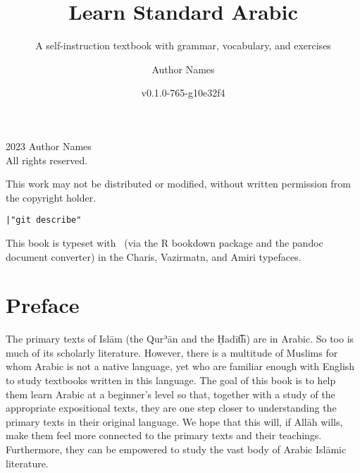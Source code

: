 \documentclass[
  10pt,
]{book}
\title{Learn Standard Arabic}
\subtitle{A self-instruction textbook with grammar, vocabulary, and exercises}
\author{Author Names}
\date{v0.1.0-765-g10e32f4}
\newcommand{\gitTag}{|"git describe"}
\begin{document}
\maketitle

\thispagestyle{empty}
\begingroup
\footnotesize
\parindent 0pt
\parskip \baselineskip
\textcopyright{} 2023 Author Names \\
All rights reserved.

    This work may not be distributed or modified, without written permission from the copyright holder.

\texttt{\gitTag}

This book is typeset with \XeLaTeX\ (via the R bookdown package and the pandoc document converter)
in the Charis, Vazirmatn, and Amiri typefaces.


\vfill




\endgroup
\clearpage

\newpage
\pagestyle{mymainstyle}
\begingroup
\setlength{\cftbeforechapskip}{-3pt}
\endgroup


{
\setcounter{tocdepth}{1}
\tableofcontents
}
\chapter*{Preface}\label{preface}


\begin{center}
\end{center}

The primary texts of Islām (the Qurʾān and the Ḥadīt͡h) are in Arabic. So too is much of its scholarly literature. However, there is a multitude of Muslims for whom Arabic is not a native language, yet who are familiar enough with English to study textbooks written in this language. The goal of this book is to help them learn Arabic at a beginner's level so that, together with a study of the appropriate expositional texts, they are one step closer to understanding the primary texts in their original language. We hope that this will, if Allāh wills, make them feel more connected to the primary texts and their teachings. Furthermore, they can be empowered to study the vast body of Arabic Islāmic literature.
\end{document}
